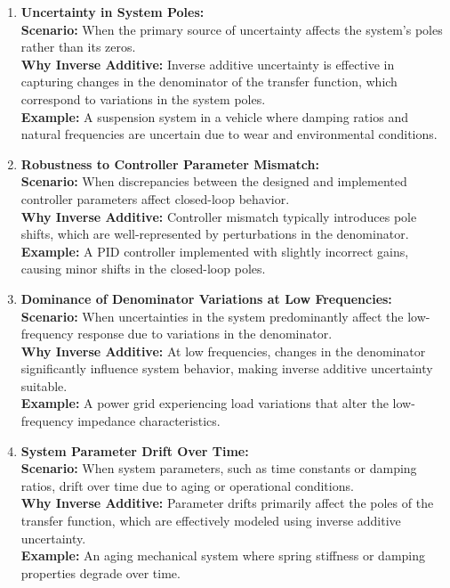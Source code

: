 \begin{enumerate}
    \item \textbf{Uncertainty in System Poles:}\\
    \textbf{Scenario:} When the primary source of uncertainty affects the system’s poles rather than its zeros.\\
    \textbf{Why Inverse Additive:} Inverse additive uncertainty is effective in capturing changes in the denominator of the transfer function, which correspond to variations in the system poles.\\
    \textbf{Example:} A suspension system in a vehicle where damping ratios and natural frequencies are uncertain due to wear and environmental conditions.

    \item \textbf{Robustness to Controller Parameter Mismatch:}\\
    \textbf{Scenario:} When discrepancies between the designed and implemented controller parameters affect closed-loop behavior.\\
    \textbf{Why Inverse Additive:} Controller mismatch typically introduces pole shifts, which are well-represented by perturbations in the denominator.\\
    \textbf{Example:} A PID controller implemented with slightly incorrect gains, causing minor shifts in the closed-loop poles.

    \item \textbf{Dominance of Denominator Variations at Low Frequencies:}\\
    \textbf{Scenario:} When uncertainties in the system predominantly affect the low-frequency response due to variations in the denominator.\\
    \textbf{Why Inverse Additive:} At low frequencies, changes in the denominator significantly influence system behavior, making inverse additive uncertainty suitable.\\
    \textbf{Example:} A power grid experiencing load variations that alter the low-frequency impedance characteristics.

    \item \textbf{System Parameter Drift Over Time:}\\
    \textbf{Scenario:} When system parameters, such as time constants or damping ratios, drift over time due to aging or operational conditions.\\
    \textbf{Why Inverse Additive:} Parameter drifts primarily affect the poles of the transfer function, which are effectively modeled using inverse additive uncertainty.\\
    \textbf{Example:} An aging mechanical system where spring stiffness or damping properties degrade over time.


\end{enumerate}
